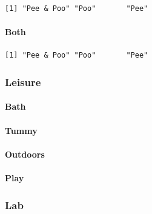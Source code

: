 \documentclass[10,portrait]{article}
\newenvironment{Shaded}{\begin{snugshade}}{\end{snugshade}}
\newcommand{\KeywordTok}[1]{\textcolor[rgb]{0.13,0.29,0.53}{\textbf{#1}}}
\newcommand{\OperatorTok}[1]{\textcolor[rgb]{0.81,0.36,0.00}{\textbf{#1}}}
\newcommand{\NormalTok}[1]{#1}
\let\oldparagraph\paragraph
\renewcommand{\paragraph}[1]{\oldparagraph{#1}\mbox{}}
\begin{document}
\begin{verbatim}
[1] "Pee & Poo" "Poo"       "Pee"      
\end{verbatim}

\paragraph{Both}\label{both}

\begin{Shaded}
\end{Shaded}

\begin{verbatim}
[1] "Pee & Poo" "Poo"       "Pee"      
\end{verbatim}

\subsubsection{Leisure}\label{leisure}

\paragraph{Bath}\label{bath}

\paragraph{Tummy}\label{tummy}

\paragraph{Outdoors}\label{outdoors}

\paragraph{Play}\label{play}

\subsubsection{Lab}\label{lab}

\printbibliography
\end{document}
